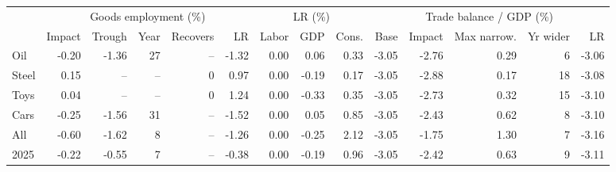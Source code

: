 \begin{tabular}{lrrrrrrrrrrrrr}
\toprule
 & \multicolumn{5}{c}{Goods employment (\%)} & \multicolumn{3}{c}{LR (\%)} & \multicolumn{5}{c}{Trade balance / GDP (\%)} \\
\cmidrule(lr){2-6}\cmidrule(lr){7-9}\cmidrule(lr){10-14}
 & Impact & Trough & Year & Recovers & LR & Labor & GDP & Cons. & Base & Impact & Max narrow. & Yr wider & LR \\
\midrule
Oil & -0.20 & -1.36 & 27 & -- & -1.32 & 0.00 & 0.06 & 0.33 & -3.05 & -2.76 & 0.29 & 6 & -3.06 \\
Steel & 0.15 & -- & -- & 0 & 0.97 & 0.00 & -0.19 & 0.17 & -3.05 & -2.88 & 0.17 & 18 & -3.08 \\
Toys & 0.04 & -- & -- & 0 & 1.24 & 0.00 & -0.33 & 0.35 & -3.05 & -2.73 & 0.32 & 15 & -3.10 \\
Cars & -0.25 & -1.56 & 31 & -- & -1.52 & 0.00 & 0.05 & 0.85 & -3.05 & -2.43 & 0.62 & 8 & -3.10 \\
All & -0.60 & -1.62 & 8 & -- & -1.26 & 0.00 & -0.25 & 2.12 & -3.05 & -1.75 & 1.30 & 7 & -3.16 \\
2025 & -0.22 & -0.55 & 7 & -- & -0.38 & 0.00 & -0.19 & 0.96 & -3.05 & -2.42 & 0.63 & 9 & -3.11 \\
\bottomrule
\end{tabular}
